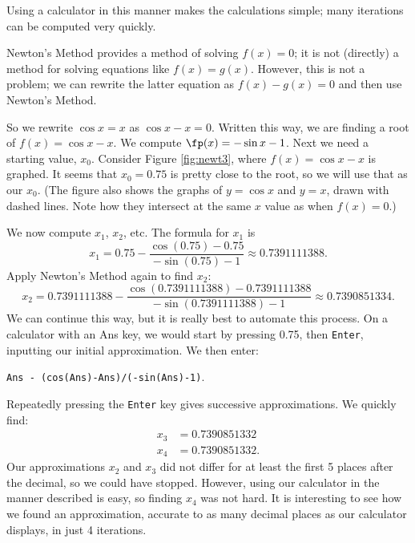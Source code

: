 Using a calculator in this manner makes the calculations simple; many iterations can be computed very quickly. \\


{Newton's Method provides a method of solving $f(x) = 0$; it is not (directly) a method for solving equations like $f(x) = g(x)$. However, this is not a problem; we can rewrite the latter equation as $f(x) - g(x)=0$ and then use Newton's Method. 

So we rewrite $\cos x=x$ as $\cos{x}-x=0$.  Written this way, we are finding a root of $f(x)=\cos{x}-x$.  We compute $\fp(x)=-\sin{x} - 1$.  Next we need a starting value, $x_0$.  Consider Figure \ref{fig:newt3}, where $f(x) = \cos x-x$ is graphed. It seems that $x_0=0.75$ is pretty close to the root, so we will use that as our $x_0$. (The figure also shows the graphs of $y=\cos x$ and $y=x$, drawn with dashed lines. Note how they intersect at the same $x$ value as when $f(x) = 0$.)


We now compute $x_1$, $x_2$, etc.  The formula for $x_1$ is 
$$x_1 = 0.75 - \frac{\cos(0.75)-0.75}{-\sin(0.75)-1}\approx 0.7391111388.$$
Apply Newton's Method again to find $x_2$:
$$x_2 = 0.7391111388 - \frac{\cos(0.7391111388)-0.7391111388}{-\sin(0.7391111388)-1}\approx 0.7390851334.$$
We can continue this way, but it is really best to automate this process.  On a calculator with an Ans key, we would start by pressing 0.75, then \texttt{Enter}, inputting our initial approximation. We then enter:
\begin{center}\texttt{Ans - (cos(Ans)-Ans)/(-sin(Ans)-1)}.\end{center}

Repeatedly pressing the \texttt{Enter} key gives successive approximations.  We quickly find:
\begin{align*}
x_3 &= 0.7390851332\\
x_4 &= 0.7390851332.
\end{align*}
Our approximations $x_2$ and $x_3$ did not differ for at least the first 5 places after the decimal, so we could have stopped. However, using our calculator in the manner described is easy, so finding $x_4$ was not hard. It is interesting to see how we found an approximation, accurate to as many decimal places as our calculator displays, in just 4 iterations.
}\\

